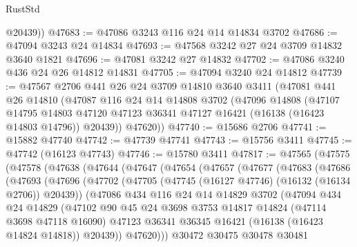 \begin{lexlean}{RustStd}
\begin{coremodule}
        @20439))
@47683 := @47086 @3243 @116 @24 @14 @14834 @3702
@47686 := @47094 @3243 @24 @14834
@47693 := @47568 @3242 @27 @24 @3709 @14832 @3640 @1821
@47696 := @47081 @3242 @27 @14832
@47702 := @47086 @3240 @436 @24 @26 @14812 @14831
@47705 := @47094 @3240 @24 @14812
@47739 := @47567
    @2706
    @441
    @26
    @24
    @3709
    @14810
    @3640
    @3411
    (@47081
      @441
      @26
      @14810
      (@47087
        @116
        @24
        @14
        @14808
        @3702
        (@47096
          @14808
          (@47107
            @14795
            @14803
            @47120
            @47123
            @36341
            @47127
            @16421
            (@16138 (@16423 @14803 @14796))
            @20439))
        @47620))
@47740 := @15686 @2706
@47741 := @15882 @47740
@47742 := @47739 @47741
@47743 := @15756 @3411
@47745 := @47742 (@16123 @47743)
@47746 := @15780 @3411
@47817 := @47565
    (@47575
      (@47578
        (@47638
          (@47644
            (@47647
              (@47654
                (@47657
                  (@47677
                    (@47683
                      (@47686
                        (@47693
                          (@47696
                            (@47702
                              (@47705 (@47745 (@16127 @47746) (@16132 (@16134 @2706)) @20439))
                              (@47086
                                @434
                                @116
                                @24
                                @14
                                @14829
                                @3702
                                (@47094
                                  @434
                                  @24
                                  @14829
                                  (@47102
                                    @90
                                    @45
                                    @24
                                    @3698
                                    @3753
                                    @14817
                                    @14824
                                    (@47114 @3698 @47118 @16090)
                                    @47123
                                    @36341
                                    @36345
                                    @16421
                                    (@16138 (@16423 @14824 @14818))
                                    @20439))
                                @47620)))
                          @30472
                          @30475
                          @30478
                          @30481

\end{coremodule}
\end{lexlean}
